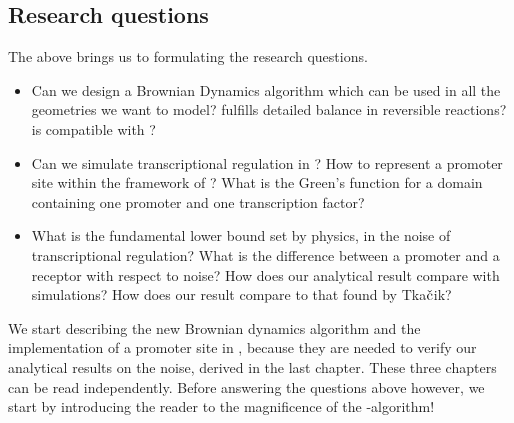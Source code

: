 \subsection{Research questions}
The above brings us to formulating the research questions.
\begin{itemize}
 \item Can we design a Brownian Dynamics algorithm which
 \subitem can be used in all the geometries we want to model?
 \subitem fulfills detailed balance in reversible reactions?
 \subitem is compatible with \GFRD ?

 \item Can we simulate transcriptional regulation in \GFRD ?
 \subitem How to represent a promoter site within the framework of \GFRD?
 \subitem What is the Green's function for a domain containing one promoter and one transcription factor?

 \item What is the fundamental lower bound set by physics, in the noise of transcriptional regulation?
 \subitem What is the difference between a promoter and a receptor with respect to noise?
 \subitem How does our analytical result compare with simulations? 
 \subitem How does our result compare to that found by Tka$\check{\rm c}$ik?
\end{itemize}
We start describing the new Brownian dynamics algorithm and the implementation of a promoter site in \GFRD, because they are needed to verify our analytical results on the noise, derived in the last chapter. These three chapters can be read independently. Before answering the questions above however, we start by introducing the reader to the magnificence of the \GFRD -algorithm!










